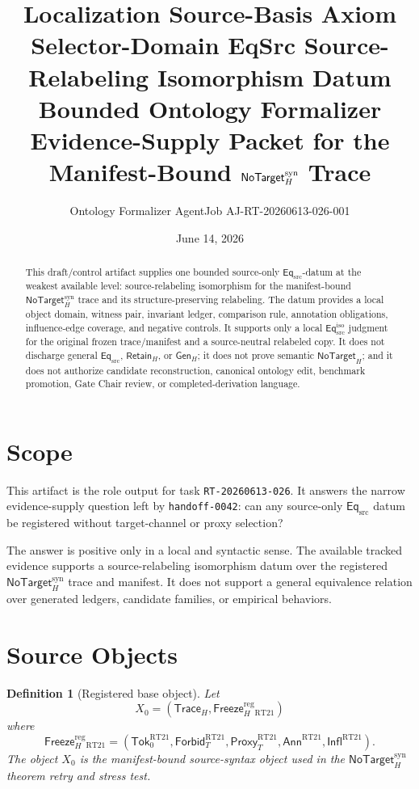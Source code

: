 \documentclass[11pt]{article}
\title{\textbf{Localization Source-Basis Axiom Selector-Domain EqSrc Source-Relabeling Isomorphism Datum}\\[0.35em]
\large Bounded Ontology Formalizer Evidence-Supply Packet for the Manifest-Bound \(\NoTargetSyn\) Trace}
\author{Ontology Formalizer AgentJob AJ-RT-20260613-026-001}
\date{June 14, 2026}
\newcommand{\EqSrc}{\mathsf{Eq}_{\mathrm{src}}}
\newcommand{\EqIso}{\mathsf{Eq}_{\mathrm{src}}^{\mathrm{iso}}}
\newcommand{\GenH}{\mathsf{Gen}_{H}}
\newcommand{\RetainH}{\mathsf{Retain}_{H}}
\newcommand{\NoTargetH}{\mathsf{NoTarget}_{H}}
\newcommand{\NoTargetSyn}{\mathsf{NoTarget}_{H}^{\mathrm{syn}}}
\newcommand{\SrcTok}{\mathsf{Tok}_{0}}
\newcommand{\ForbidT}{\mathsf{Forbid}_{T}}
\newcommand{\ProxyT}{\mathsf{Proxy}_{T}}
\newcommand{\TraceH}{\mathsf{Trace}_{H}}
\newcommand{\Annot}{\mathsf{Ann}}
\newcommand{\Influence}{\mathsf{Infl}}
\newcommand{\FreezeH}{\mathsf{Freeze}_{H}}
\newtheorem{definitionblock}{Definition}
\begin{document}
\maketitle

\begin{abstract}
This draft/control artifact supplies one bounded source-only
\(\EqSrc\)-datum at the weakest available level: source-relabeling
isomorphism for the manifest-bound \(\NoTargetSyn\) trace and its
structure-preserving relabeling. The datum provides a local object domain,
witness pair, invariant ledger, comparison rule, annotation obligations,
influence-edge coverage, and negative controls. It supports only a local
\(\EqIso\) judgment for the original frozen trace/manifest and a
source-neutral relabeled copy. It does not discharge general \(\EqSrc\),
\(\RetainH\), or \(\GenH\); it does not prove semantic \(\NoTargetH\);
and it does not authorize candidate reconstruction, canonical ontology
edit, benchmark promotion, Gate Chair review, or completed-derivation
language.
\end{abstract}

\section{Scope}

This artifact is the role output for task \texttt{RT-20260613-026}. It
answers the narrow evidence-supply question left by
\texttt{handoff-0042}: can any source-only \(\EqSrc\) datum be registered
without target-channel or proxy selection?

The answer is positive only in a local and syntactic sense. The available
tracked evidence supports a source-relabeling isomorphism datum over the
registered \(\NoTargetSyn\) trace and manifest. It does not support a
general equivalence relation over generated ledgers, candidate families, or
empirical behaviors.

\section{Source Objects}

\begin{definitionblock}[Registered base object]
Let
\[
    X_{0}=(\TraceH,\FreezeH^{\mathrm{reg}}_{\mathrm{RT21}})
\]
where
\[
    \FreezeH^{\mathrm{reg}}_{\mathrm{RT21}} =
    (\SrcTok^{\mathrm{RT21}},\ForbidT^{\mathrm{RT21}},
    \ProxyT^{\mathrm{RT21}},\Annot^{\mathrm{RT21}},
    \Influence^{\mathrm{RT21}}).
\]
The object \(X_{0}\) is the manifest-bound source-syntax object used in
the \(\NoTargetSyn\) theorem retry and stress test.
\end{definitionblock}
\end{document}
